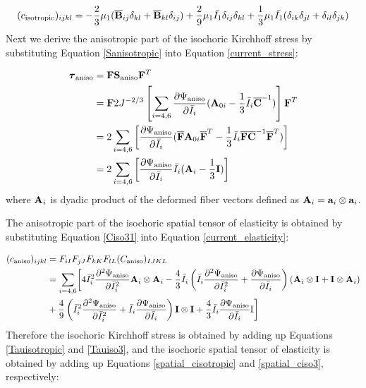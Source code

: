 \begin{appendices}
\begin{equation} \label{spatial_cisotropic}
(c_\mathrm{isotropic})_{ijkl} 
= - \frac{2}{3}\mu_1({\overline{\bold{B}}}_{ij}\delta_{kl} + {\overline{\bold{B}}}_{kl}\delta_{ij}) 
+ \frac{2}{9}\mu_1\bar{I_1}  \delta_{ij}\delta_{kl}
+ \frac{1}{3}\mu_1\bar{I_1} (\delta_{ik}\delta_{jl} + \delta_{il}\delta_{jk})
\end{equation} 
Next we derive the anisotropic part of the isochoric Kirchhoff stress by substituting Equation \ref{Sanisotropic} into Equation \ref{current_stress}:

\begin{equation} \label{Tauiso3}
\begin{split}
\boldsymbol{\tau}_\mathrm{aniso} 
&= \bold{F}\bold{S}_\mathrm{aniso}{\bold{F}}^T \\
&= \bold{F} 2J^{-2/3} \left[\sum_{i = 4, 6}\frac{\partial{\Psi_\mathrm{aniso}}}{\partial{\bar{I}_i}}  (\bold{A}_{0i} - \frac{1}{3}\bar{I}_i\overline{\bold{C}}^{-1})\right] {\bold{F}}^T \\
&= 2\sum_{i = 4, 6}\left[\frac{\partial{\Psi_\mathrm{aniso}}}{\partial{\bar{I}_i}} ({\overline{\bold{F}}}\bold{A}_{0i}{\overline{\bold{F}}}^T - \frac{1}{3}\bar{I}_i{\overline{\bold{F}}}\overline{\bold{C}}^{-1}{\overline{\bold{F}}}^T)\right] \\
&= 2\sum_{i = 4, 6}\left[\frac{\partial{\Psi_\mathrm{aniso}}}{\partial{\bar{I}_i}}\bar{I}_i (\bold{A}_{i} - \frac{1}{3}\bold{I})\right]
\end{split}
\end{equation}
where $\bold{A}_i$ is dyadic product of the deformed fiber vectors defined as $\bold{A}_i = \bold{a}_i \otimes \bold{a}_i$. 

The anisotropic part of the isochoric spatial tensor of elasticity is obtained by substituting Equation \ref{Ciso31} into Equation \ref{current_elasticity}:

\begin{equation} \label{spatial_ciso3}
\begin{split}
(c_\mathrm{aniso})_{ijkl} &=  F_{iI}F_{jJ}F_{kK}F_{lL}(C_\mathrm{aniso})_{IJKL} \\
&= 
 \sum_{i = 4, 6} \biggl[4{\bar{I}_i}^2\frac{\partial^2\Psi_\mathrm{aniso}}{\partial{\bar{I}_i}^2} \bold{A}_{i} \otimes \bold{A}_{i} - \frac{4}{3}\bar{I}_i\left(\bar{I}_i\frac{\partial^2\Psi_\mathrm{aniso}}{\partial{\bar{I}_i}^2} + \frac{\partial\Psi_\mathrm{aniso}}{\partial{\bar{I}_i}}\right)
 (\bold{A}_{i} \otimes \bold{I} + \bold{I} \otimes \bold{A}_i) \\
&+ \frac{4}{9}\left({\bar{I}_i}^2\frac{\partial^2\Psi_\mathrm{aniso}}{\partial{\bar{I}_i}^2} + \bar{I}_i\frac{\partial\Psi_\mathrm{aniso}}{\partial{\bar{I}_i}}\right)\bold{I} \otimes \bold{I} 
+ \frac{4}{3}\bar{I}_i \frac{\partial\Psi_\mathrm{aniso}}{\partial{\bar{I}_i}} \mathbb{I} \biggr]
\end{split}
\end{equation}
Therefore the isochoric Kirchhoff stress is obtained by adding up Equations \ref{Tauisotropic} and \ref{Tauiso3}, and the isochoric spatial tensor of elasticity is obtained by adding up Equations \ref{spatial_cisotropic} and \ref{spatial_ciso3}, respectively:


\end{appendices}
